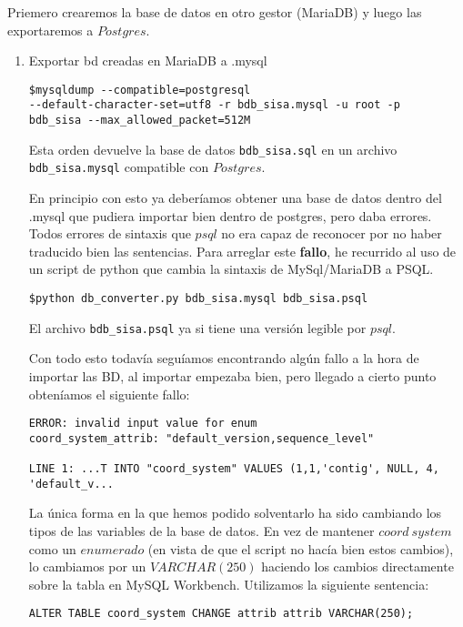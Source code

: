 \documentclass[12pt,a4paper]{article}
\begin{document}
Priemero crearemos la base de datos en otro gestor (MariaDB) y luego las exportaremos a $Postgres$.

\begin{enumerate}
\item Exportar bd creadas en MariaDB a .mysql

\begin{verbatim} 
$mysqldump --compatible=postgresql 
--default-character-set=utf8 -r bdb_sisa.mysql -u root -p 
bdb_sisa --max_allowed_packet=512M
\end{verbatim}

Esta orden devuelve la base de datos \verb|bdb_sisa.sql| en un archivo \verb|bdb_sisa.mysql| compatible con $Postgres$.

En principio con esto ya deberíamos obtener una base de datos dentro del .mysql que pudiera importar bien dentro de postgres, pero daba errores. Todos errores de sintaxis que $psql$ no era capaz de reconocer por no haber traducido bien las sentencias.
Para arreglar este \textbf{fallo}, he recurrido al uso de un script de python que cambia la sintaxis de MySql/MariaDB a PSQL.

\begin{verbatim} 
$python db_converter.py bdb_sisa.mysql bdb_sisa.psql
\end{verbatim}

El archivo \verb|bdb_sisa.psql| ya si tiene una versión legible por $psql$.

Con todo esto todavía seguíamos encontrando algún fallo a la hora de importar las BD, al importar empezaba bien, pero llegado a cierto punto obteníamos el siguiente fallo:

\begin{verbatim} 
ERROR: invalid input value for enum
coord_system_attrib: "default_version,sequence_level"

LINE 1: ...T INTO "coord_system" VALUES (1,1,'contig', NULL, 4, 'default_v...
\end{verbatim}

\newpage

La única forma en la que hemos podido solventarlo ha sido cambiando los tipos de las variables de la base de datos. En vez de mantener $coord \ system$ como un $enumerado$ (en vista de que el script no hacía bien estos cambios), lo cambiamos por un $VARCHAR(250)$ haciendo los cambios directamente sobre la tabla en MySQL Workbench. Utilizamos la siguiente sentencia:

\begin{verbatim} 
ALTER TABLE coord_system CHANGE attrib attrib VARCHAR(250);
\end{verbatim}


\end{enumerate}
\end{document}
